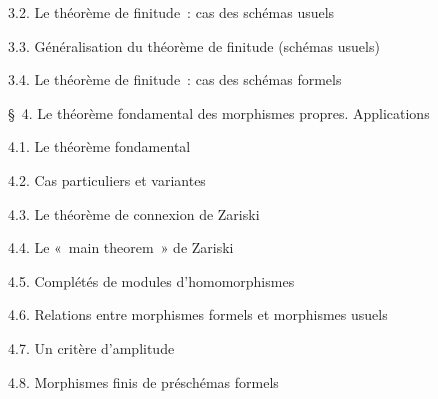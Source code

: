 3.2. Le théorème de finitude~: cas des schémas usuels 

3.3. Généralisation du théorème de finitude (schémas usuels) 

3.4. Le théorème de finitude~: cas des schémas formels 

\medskip
\S~4. Le théorème fondamental des morphismes propres. Applications 

4.1. Le théorème fondamental 

4.2. Cas particuliers et variantes 

4.3. Le théorème de connexion de Zariski 

4.4. Le «~main theorem~» de Zariski 

4.5. Complétés de modules d'homomorphismes 

4.6. Relations entre morphismes formels et morphismes usuels 

4.7. Un critère d'amplitude 

4.8. Morphismes finis de préschémas formels 

